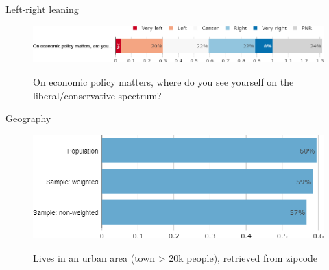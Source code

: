 \begin{framefont}{\small}
\begin{frame}{Left-right leaning}%
\begin{figure}[h!]
\centering
\caption{On economic policy matters, where do you see yourself on the liberal/conservative spectrum?}
\includegraphics[width=.87\paperwidth]{../figures/FR/left_right_FR.png} \\
\end{figure}
\end{frame}

\begin{frame}{Geography}%
\begin{figure}[h!]
\centering
\caption{Lives in an urban area (town > 20k people), retrieved from zipcode}
\includegraphics[width=.43\paperwidth]{../figures/FR/urban_FR_comp.png} \\
\vspace{.2cm}
\end{figure}
\end{frame}


\end{framefont}

